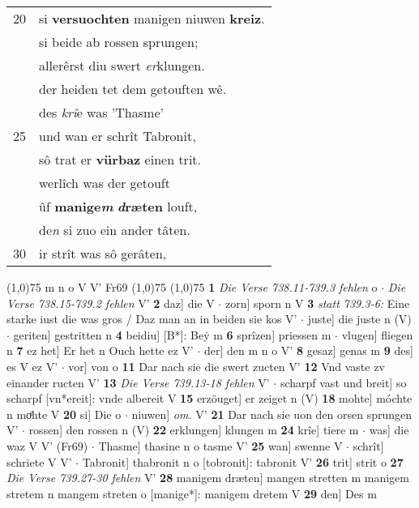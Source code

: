 \documentclass[8pt,a4paper,notitlepage]{article}
\begin{document}
\begin{table}[ht]
\begin{minipage}[t]{0.5\linewidth}
\begin{tabular}{rl}
20 & si \textbf{versuochten} manigen niuwen \textbf{kreiz}.\\ 
 & si beide ab rossen sprungen;\\ 
 & allerêrst diu swert \textit{er}klungen.\\ 
 & der heiden tet dem getouften wê.\\ 
 & des \textit{krî}e was 'Thasme'\\ 
25 & und wan er schrît Tabronit,\\ 
 & sô trat er \textbf{vürbaz} einen trit.\\ 
 & werlîch was der getouft\\ 
 & ûf \textbf{manige\textit{m}} \textbf{\textit{d}ræten} louft,\\ 
 & de\textit{n} si zuo ein ander tâten.\\ 
30 & ir strît was sô gerâten,\\ 
\end{tabular}
\scriptsize
\line(1,0){75} \newline
m n o V V' Fr69 \newline
\line(1,0){75} \newline
\newline
\line(1,0){75} \newline
\textbf{1} \textit{Die Verse 738.11-739.3 fehlen} o   $\cdot$ \textit{Die Verse 738.15-739.2 fehlen} V'  \textbf{2} daz] die V  $\cdot$ zorn] sporn n V \textbf{3} \textit{statt 739.3-6:} Eine starke iust die was gros / Daz man an in beiden sie kos V'   $\cdot$ juste] die juste n (V)  $\cdot$ geriten] gestritten n \textbf{4} beidiu] [B*]: Beẏ m \textbf{6} sprîzen] priessen m  $\cdot$ vlugen] fliegen n \textbf{7} ez het] Er het n Ouch hette ez V'  $\cdot$ der] den m n o V' \textbf{8} gesaz] genas m \textbf{9} des] es V ez V'  $\cdot$ vor] von o \textbf{11} Dar nach sie die swert zucten V' \textbf{12} Vnd vaste zv einander ructen V' \textbf{13} \textit{Die Verse 739.13-18 fehlen} V'   $\cdot$ scharpf vast und breit] so scharpf [vn*ereit]: vnde albereit V \textbf{15} erzöuget] er zeiget n (V) \textbf{18} mohte] móchte n moͤhte V \textbf{20} si] Die o  $\cdot$ niuwen] \textit{om.} V' \textbf{21} Dar nach sie uon den orsen sprungen V'  $\cdot$ rossen] den rossen n (V) \textbf{22} erklungen] klungen m \textbf{24} krîe] tiere m  $\cdot$ was] die waz V V' (Fr69)  $\cdot$ Thasme] thasine n o tasme V' \textbf{25} wan] swenne V  $\cdot$ schrît] schriete V V'  $\cdot$ Tabronit] thabronit n o [tobronit]: tabronit V' \textbf{26} trit] strit o \textbf{27} \textit{Die Verse 739.27-30 fehlen} V'  \textbf{28} manigem dræten] mangen stretten m manigem stretem n mangem streten o [manige*]: manigem dretem V \textbf{29} den] Des m \newline
\end{minipage}
\end{table}
\end{document}
